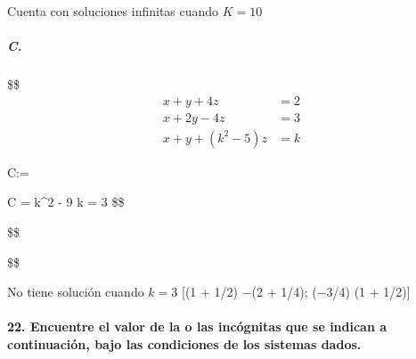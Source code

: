\documentclass[
]{article}
\begin{document}
Cuenta con soluciones infinitas cuando \(K=10\)

\hypertarget{c.-1}{%
\subparagraph{C.}\label{c.-1}}

\$\$ \begin{align*}
    x+y+4z&=2\\
    x+2y-4z&=3\\
    x+y+(k^2-5)z&=k
\end{align*}

\rightarrow

C:= 

\therefore

\textbar C\textbar{} = k\^{}2 - 9 \therefore k = 3 \$\$

\$\$ 


\$\$

No tiene solución cuando \(k=3\) {[}(1 + 1/2) −(2 + 1/4); (−3/4) (1 +
1/2){]}

\hypertarget{encuentre-el-valor-de-la-o-las-incuxf3gnitas-que-se-indican-a-continuaciuxf3n-bajo-las-condiciones-de-los-sistemas-dados.}{%
\paragraph{22. Encuentre el valor de la o las incógnitas que se indican
a continuación, bajo las condiciones de los sistemas
dados.}\label{encuentre-el-valor-de-la-o-las-incuxf3gnitas-que-se-indican-a-continuaciuxf3n-bajo-las-condiciones-de-los-sistemas-dados.}}
\end{document}
